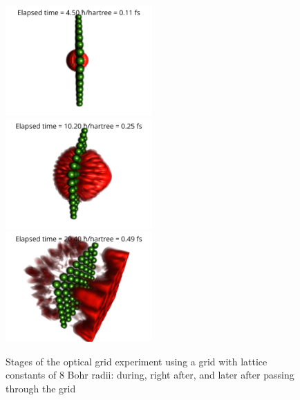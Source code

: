 \begin{figure}
	\begin{center}
		\includegraphics[width=0.5\textwidth]{figures/optical_grid_8_bohr_rad_01.png}
		\includegraphics[width=0.5\textwidth]{figures/optical_grid_8_bohr_rad_02.png}
		\includegraphics[width=0.5\textwidth]{figures/optical_grid_8_bohr_rad_03.png}
		\caption{Stages of the optical grid experiment using a grid with lattice constants of $8$ Bohr radii: during, right after, and later after passing through the grid}
		\label{fig:optical_grid_stages_8_bohr_radii}
	\end{center}	
\end{figure}

